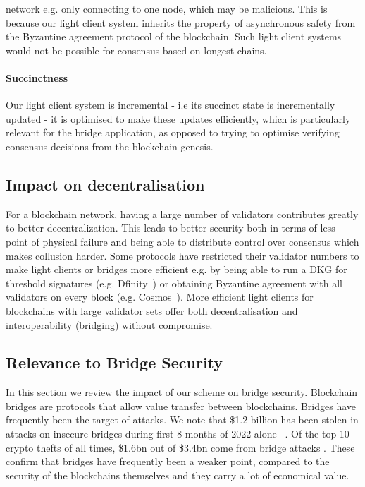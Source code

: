 network e.g. only connecting to one node, which may be malicious. This is because our light client system inherits the property of asynchronous safety from the Byzantine agreement 
protocol of the blockchain. Such light client systems would not be possible for consensus based on longest chains.  
\vspace{-0.2cm}
\noindent\paragraph{Succinctness}Our light client system is incremental - i.e its succinct state is incrementally updated - it is optimised to make these updates efficiently, which is particularly relevant for the bridge application, as opposed to trying to optimise verifying consensus decisions from the blockchain genesis.
\vspace{-0.2cm}
\subsection{Impact on decentralisation} For a blockchain network, having  a large number of validators  contributes greatly to better decentralization. This leads to better security both in terms of less point of physical failure and being able to distribute control over consensus which makes collusion harder. Some protocols have restricted their validator numbers to make light clients or bridges more efficient e.g. by being able to run a DKG for threshold signatures (e.g. Dfinity~\cite{dfinity}) or obtaining Byzantine agreement with all validators on every block (e.g. Cosmos~\cite{tendermint_paper}). More efficient light clients for blockchains with large validator sets offer both decentralisation and interoperability (bridging) without compromise.

\vspace{-0.25cm}
\subsection{Relevance to Bridge Security} 
\noindent In this section we review the impact of our scheme on bridge security. Blockchain bridges are protocols that allow value transfer between blockchains. Bridges have frequently been the target of attacks. We note that \$1.2 billion has been stolen in attacks on insecure bridges during first 8 months of 2022 alone ~\cite{elliptic_harmony,elliptic_nomad}. Of the top 10 crypto thefts of all times, \$1.6bn out of \$3.4bn come from bridge attacks \cite{elliptic_nomad}. These confirm that bridges have frequently been a weaker point, compared to the security of the blockchains themselves and they carry a lot of economical value.

